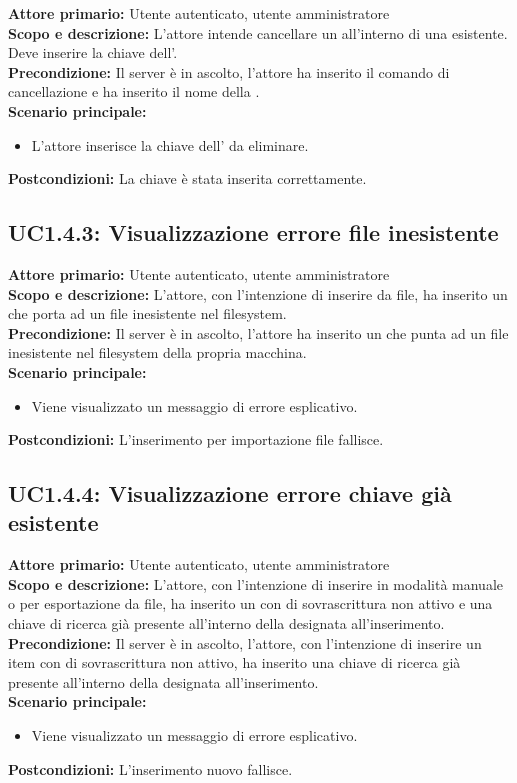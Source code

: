 \documentclass{scalatekids-article}
\begin{document}
\textbf{Attore primario:} Utente autenticato, utente amministratore\\
\textbf{Scopo e descrizione:} L'attore intende cancellare un  all'interno di una  esistente. Deve inserire la chiave dell'.\\
\textbf{Precondizione:} Il server è in ascolto, l'attore ha inserito il comando di cancellazione  e ha inserito il nome della .\\
\textbf{Scenario principale:}
\begin{itemize}
\item L'attore inserisce la chiave dell' da eliminare.
\end{itemize}
\textbf{Postcondizioni:} La chiave è stata inserita correttamente.

\subsection{UC1.4.3: Visualizzazione errore file inesistente}

\textbf{Attore primario:} Utente autenticato, utente amministratore\\
\textbf{Scopo e descrizione:} L'attore, con l'intenzione di inserire  da file, ha inserito un  che porta ad un file inesistente nel filesystem.\\
\textbf{Precondizione:} Il server è in ascolto, l'attore ha inserito un  che punta ad un file inesistente nel filesystem della propria macchina.\\
\textbf{Scenario principale:}
\begin{itemize}
\item Viene visualizzato un messaggio di errore esplicativo.
\end{itemize}
\textbf{Postcondizioni:} L'inserimento per importazione file fallisce.

\subsection{UC1.4.4: Visualizzazione errore chiave già esistente}

\textbf{Attore primario:} Utente autenticato, utente amministratore\\
\textbf{Scopo e descrizione:} L'attore, con l'intenzione di inserire  in modalità manuale o per esportazione da file, ha inserito un  con  di sovrascrittura
non attivo e una chiave di ricerca già presente all'interno della  designata all'inserimento.\\
\textbf{Precondizione:} Il server è in ascolto, l'attore, con l'intenzione di inserire un item con  di sovrascrittura non attivo, ha inserito una chiave di ricerca già presente
all'interno della  designata all'inserimento.\\
\textbf{Scenario principale:}
\begin{itemize}
\item Viene visualizzato un messaggio di errore esplicativo.
\end{itemize}
\textbf{Postcondizioni:} L'inserimento nuovo  fallisce.
\end{document}
